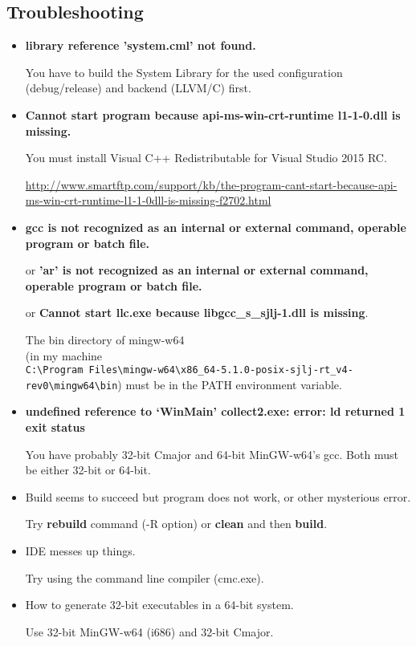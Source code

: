 \documentclass[oneside, a4paper, 11pt]{article}
\begin{document}
\subsection{Troubleshooting}

\begin{itemize}

\item
\textbf{library reference 'system.cml' not found.}

You have to build the System Library for the used configuration (debug/release) and backend (LLVM/C) first.

\item
\textbf{Cannot start program because api-ms-win-crt-runtime l1-1-0.dll is missing.}

You must install Visual C++ Redistributable for Visual Studio 2015 RC.

\url{http://www.smartftp.com/support/kb/the-program-cant-start-because-api-ms-win-crt-runtime-l1-1-0dll-is-missing-f2702.html}

\item

\textbf{gcc is not recognized as an internal or external command, operable program or batch file.}

or \textbf{'ar' is not recognized as an internal or external command, operable program or batch file.}

or \textbf{Cannot start llc.exe because libgcc\_s\_sjlj-1.dll is missing}.

The bin directory of mingw-w64\\
(in my machine\\
\verb|C:\Program Files\mingw-w64\x86_64-5.1.0-posix-sjlj-rt_v4-rev0\mingw64\bin|)
must be in the PATH environment variable.

\item
\textbf{undefined reference to `WinMain' collect2.exe: error: ld returned 1 exit status}

You have probably 32-bit Cmajor and 64-bit MinGW-w64's gcc.
Both must be either 32-bit or 64-bit.

\item
Build seems to succeed but program does not work, or other mysterious error.

Try \textbf{rebuild} command (-R option) or \textbf{clean} and then \textbf{build}.

\item
IDE messes up things.

Try using the command line compiler (cmc.exe).

\item
How to generate 32-bit executables in a 64-bit system.

Use 32-bit MinGW-w64 (i686) and 32-bit Cmajor.
\end{itemize}
\end{document}

